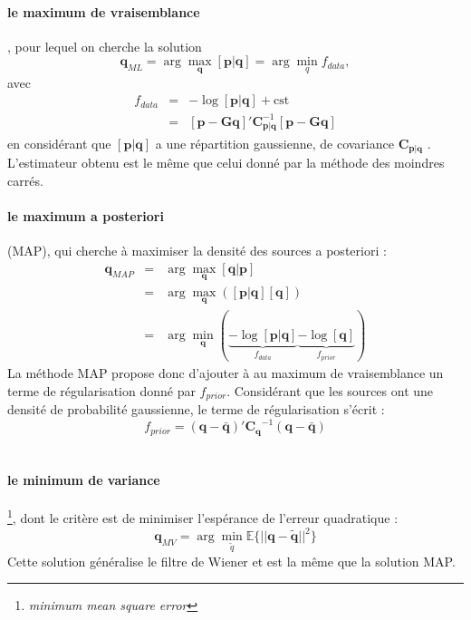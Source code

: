 \paragraph{\tbullet le maximum de vraisemblance}, pour lequel on cherche la solution 
	\begin{equation}
		\bm{q}_{ML} = \arg\max_{\bm{q}} [ \bm{p}|\bm{q} ]=\arg\min_q f_{data},
	\end{equation}	
	 avec 
	\begin{eqnarray}
		f_{data} &=&-\log[\bm{p}|\bm{q}] + \text{cst}\\
				 &=& [\bm{p}-\bm{Gq}]'  \bm{C}_{\bm{p}|\bm{q}}^{-1}  [\bm{p}-\bm{Gq}]
	\end{eqnarray}
	en considérant que $[ \bm{p}|\bm{q} ]$ a une répartition gaussienne, de covariance $\bm{C}_{\bm{p}|\bm{q}}$ . L'estimateur obtenu est le même que celui donné par la méthode des moindres carrés.\\
	 	
\paragraph{\tbullet le maximum a posteriori} (MAP), qui cherche à maximiser la densité des sources a posteriori : 
	\begin{eqnarray}
		\bm{q}_{MAP} &=& \arg\max_{\bm{q}}[ \bm{q} |  \bm{p}  ]\\
					& =& \arg\max_{\bm{q}}([\bm{p} | \bm{q}][\bm{q}])\\
					&=& \arg\min_{\bm{q}} ( \underbrace{-\log[\bm{p}|\bm{q}]}_{f_{data}} \underbrace{- \log[\bm{q}]}_{f_{prior}})
	\end{eqnarray}
	La méthode MAP propose donc d'ajouter à au maximum de vraisemblance un terme de régularisation donné par $f_{prior}$. Considérant que les sources ont une densité de probabilité gaussienne, le terme de régularisation s'écrit : 
	\begin{equation}
		f_{prior}= (\bm{q}- \bm{\bar{q}})' \bm{C_q}^{-1}(\bm{q}- \bm{\bar{q}})
	\end{equation}\\	
	
\paragraph{\tbullet le minimum de variance} \footnote{\textit{minimum mean square error}}, dont le critère est de minimiser l'espérance de l'erreur quadratique : 
	\begin{equation}
		\bm{q}_{MV} = \arg\min_{\tilde{q}} \mathbb{E}\{||\bm{q}-\bm{\tilde{q}}||^2\}
	\end{equation}	
	Cette solution généralise le filtre de Wiener et est la même que la solution MAP. \\


